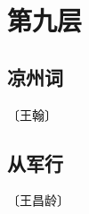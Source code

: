 \documentclass[12pt,UTF-8,openany]{ctexbook}
\begin{document}
\vspace{8pt}


\chapter{第九层}

\section{凉州词}

\begin{center}
    \vspace{10pt}
    
    \begin{normalsize}
        
        〔王翰〕
        
    \end{normalsize}
    
    \vspace{8pt}
    
    \begin{large}
        
        
        
    \end{large}
    
\end{center}

\vspace{8pt}


\section{从军行}

\begin{center}
    \vspace{10pt}
    
    \begin{normalsize}
        
        〔王昌龄〕
        
    \end{normalsize}
    
    \vspace{8pt}
    
    \begin{large}
        
        
        
    \end{large}
    
\end{center}
\end{document}

